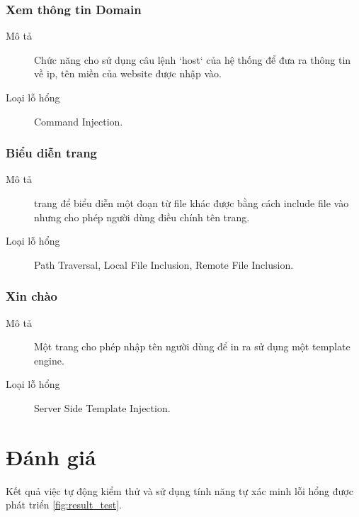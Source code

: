 \documentclass[./../main.tex]{subfiles}
\begin{document}
\subsubsection{Xem thông tin Domain}

\begin{description}
	\item[Mô tả] Chức năng cho sử dụng câu lệnh `host` của hệ thống để đưa ra thông tin về ip, tên miền của website được nhập vào.
	\item[Loại lỗ hổng] Command Injection.
\end{description}

\subsubsection{Biểu diễn trang}

\begin{description}
	\item[Mô tả] trang để biểu diễn một đoạn từ file khác được bằng cách
	      include file vào nhưng cho phép người dùng điều chính tên trang.
	\item[Loại lỗ hổng] Path Traversal, Local File Inclusion, Remote
	      File Inclusion.
\end{description}

\subsubsection{Xin chào}

\begin{description}
	\item[Mô tả] Một trang cho phép nhập tên người dùng để in ra sử dụng một template engine.
	\item[Loại lỗ hổng] Server Side Template Injection.
\end{description}


\section{Đánh giá}

Kết quả việc tự động kiểm thử và sử dụng tính năng tự xác minh lỗi
hổng được phát triển \ref{fig:result_test}.
\end{document}
